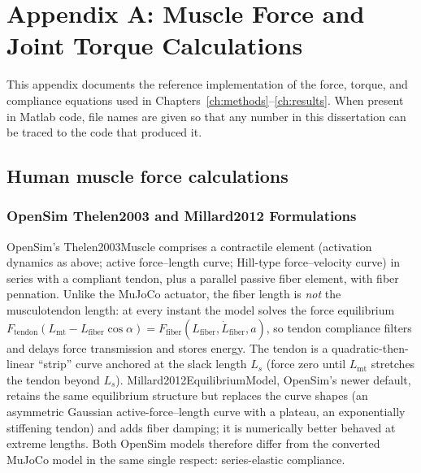 \chapter{Appendix A: Muscle Force and Joint Torque Calculations}\label{app:muscle_calcs}
\graphicspath{{figs/92-AppendixA/}}

This appendix documents the reference implementation of the force, torque, and compliance equations used in Chapters~\ref{ch:methods}--\ref{ch:results}. When present in Matlab code, file names are given so that any number in this dissertation can be traced to the code that produced it.

\section{Human muscle force calculations}
\subsection{OpenSim Thelen2003 and Millard2012 Formulations}

OpenSim's Thelen2003Muscle comprises a contractile element (activation
dynamics as above; active force--length curve; Hill-type force--velocity
curve) in series with a compliant tendon, plus a parallel passive fiber
element, with fiber pennation. Unlike the MuJoCo actuator, the fiber
length is \emph{not} the musculotendon length: at every instant the
model solves the force equilibrium
$F_{\text{tendon}}(L_{\text{mt}} - L_{\text{fiber}}\cos\alpha)
 = F_{\text{fiber}}(L_{\text{fiber}}, \dot{L}_{\text{fiber}}, a)$,
so tendon compliance filters and delays force transmission and stores
energy. The tendon is a quadratic-then-linear ``strip'' curve anchored
at the slack length $L_s$ (force zero until $L_{\text{mt}}$ stretches
the tendon beyond $L_s$). Millard2012EquilibriumModel, OpenSim's newer
default, retains the same equilibrium structure but replaces the curve
shapes (an asymmetric Gaussian active-force--length curve with a
plateau, an exponentially stiffening tendon) and adds fiber damping; it
is numerically better behaved at extreme lengths. Both OpenSim models
therefore differ from the converted MuJoCo model in the same single
respect: series-elastic compliance.

